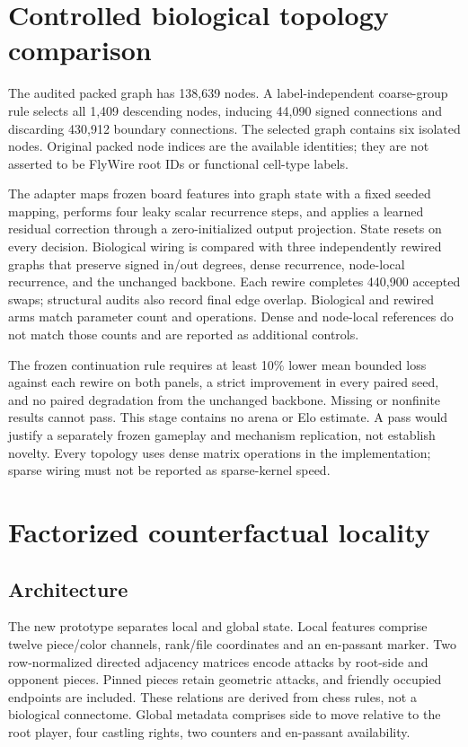 \documentclass{article}
\begin{document}
\section{Controlled biological topology comparison}
The audited packed graph has 138,639 nodes. A label-independent coarse-group
rule selects all 1,409 descending nodes, inducing 44,090 signed connections and
discarding 430,912 boundary connections. The selected graph contains six
isolated nodes. Original packed node indices are the available identities;
they are not asserted to be FlyWire root IDs or functional cell-type labels.

The adapter maps frozen board features into graph state with a fixed seeded
mapping, performs four leaky scalar recurrence steps, and applies a learned
residual correction through a zero-initialized output projection. State resets
on every decision. Biological wiring is compared with three independently
rewired graphs that preserve signed in/out degrees, dense recurrence, node-local
recurrence, and the unchanged backbone. Each rewire completes 440,900 accepted
swaps; structural audits also record final edge overlap. Biological and rewired
arms match parameter count and operations. Dense and node-local references do
not match those counts and are reported as additional controls.


\BioResults{}

The frozen continuation rule requires at least 10\% lower mean bounded loss
against each rewire on both panels, a strict improvement in every paired seed,
and no paired degradation from the unchanged backbone. Missing or nonfinite
results cannot pass. This stage contains no arena or Elo estimate. A pass would
justify a separately frozen gameplay and mechanism replication, not establish
novelty. Every topology uses dense matrix operations in the implementation;
sparse wiring must not be reported as sparse-kernel speed.

\section{Factorized counterfactual locality}
\subsection{Architecture}
The new prototype separates local and global state. Local features comprise
twelve piece/color channels, rank/file coordinates and an en-passant marker.
Two row-normalized directed adjacency matrices encode attacks by root-side and
opponent pieces. Pinned pieces retain geometric attacks, and friendly occupied
endpoints are included. These relations are derived from chess rules, not a
biological connectome. Global metadata comprises side to move relative to the
root player, four castling rights, two counters and en-passant availability.
\end{document}
